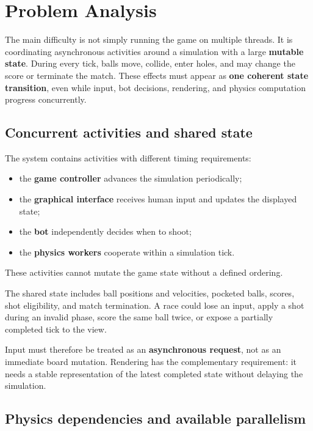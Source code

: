 \clearpage
\section{Problem Analysis}

The main difficulty is not simply running the game on multiple threads.
It is coordinating asynchronous activities around a simulation with a large \textbf{mutable state}.
During every tick, balls move, collide, enter holes, and may change the score or terminate the match.
These effects must appear as \textbf{one coherent state transition}, even while input, bot decisions, rendering, and physics computation progress concurrently.

\subsection{Concurrent activities and shared state}

The system contains activities with different timing requirements:

\begin{itemize}
    \item the \textbf{game controller} advances the simulation periodically;
    \item the \textbf{graphical interface} receives human input and updates the displayed state;
    \item the \textbf{bot} independently decides when to shoot;
    \item the \textbf{physics workers} cooperate within a simulation tick.
\end{itemize}

These activities cannot mutate the game state without a defined ordering.

The shared state includes ball positions and velocities, pocketed balls, scores, shot eligibility, and match termination.
A race could lose an input, apply a shot during an invalid phase, score the same ball twice, or expose a partially completed tick to the view.

Input must therefore be treated as an \textbf{asynchronous request}, not as an immediate board mutation.
Rendering has the complementary requirement: it needs a stable representation of the latest completed state without delaying the simulation.

\subsection{Physics dependencies and available parallelism}

